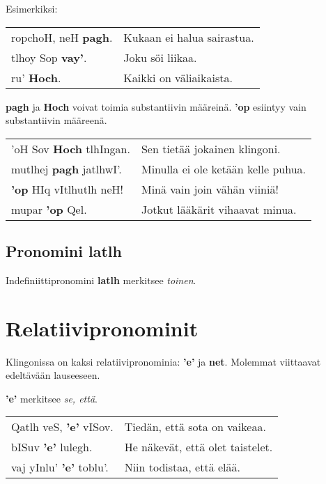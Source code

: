 \documentclass{book}
\begin{document}
Esimerkiksi:

\begin{tabular}{l l}
    ropchoH, neH \textbf{pagh}. & Kukaan ei halua sairastua. \\
    tlhoy Sop \textbf{vay'}. & Joku söi liikaa. \\
    ru' \textbf{Hoch}. & Kaikki on väliaikaista. \\
\end{tabular}

\textbf{pagh} ja \textbf{Hoch} voivat toimia substantiivin määreinä. \textbf{'op} esiintyy vain substantiivin määreenä.

\begin{tabular}{l l}
    'oH Sov \textbf{Hoch} tlhIngan. & Sen tietää jokainen klingoni. \\
    mutlhej \textbf{pagh} jatlhwI'. & Minulla ei ole ketään kelle puhua. \\
    \textbf{'op} HIq vItlhutlh neH! & Minä vain join vähän viiniä! \\
    mupar \textbf{'op} Qel. & Jotkut lääkärit vihaavat minua. \\
\end{tabular}

\subsection{Pronomini latlh}

Indefiniittipronomini \textbf{latlh} merkitsee \textit{toinen}.

\section{Relatiivipronominit}

Klingonissa on kaksi relatiivipronominia: \textbf{'e'} ja \textbf{net}.
Molemmat viittaavat edeltävään lauseeseen.

\textbf{'e'} merkitsee \textit{se, että}.

\begin{tabular}{l l}
    Qatlh veS, \textbf{'e'} vISov. & Tiedän, että sota on vaikeaa. \\
    bISuv \textbf{'e'} lulegh. & He näkevät, että olet taistelet. \\
    vaj yInlu' \textbf{'e'} toblu'. & Niin todistaa, että elää. \\
\end{tabular}
\end{document}
